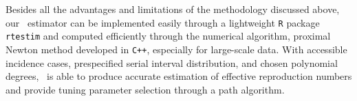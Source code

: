 Besides all the advantages and limitations of the methodology discussed above, 
our \RtEstim\ estimator can be implemented easily through a lightweight \texttt{R} 
package \texttt{rtestim} and computed efficiently through the numerical algorithm, 
proximal Newton method developed in \texttt{C++}, especially for large-scale data. 
With accessible incidence cases, prespecified serial interval distribution, and
chosen polynomial degrees, \RtEstim\ is able to produce accurate estimation 
of effective reproduction numbers and provide tuning parameter selection through a path algorithm. 
